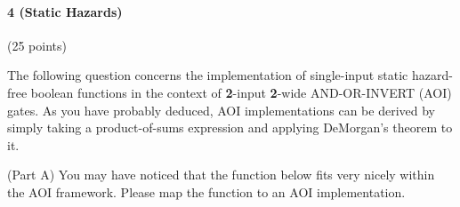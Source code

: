 \vspace{0.15in}

\paragraph{4 (Static Hazards)}
(25 points)

\vspace{0.15in}

The following question concerns the implementation of single-input static hazard-free boolean functions in the context of \textbf{2}-input \textbf{2}-wide AND-OR-INVERT (AOI) gates. As you have probably deduced, AOI implementations can be derived by simply taking a product-of-sums expression and applying DeMorgan's theorem to it. 

\vspace{0.15in}

(Part A) You may have noticed that the function below fits very nicely within the AOI framework. Please map the function to an AOI implementation. 
